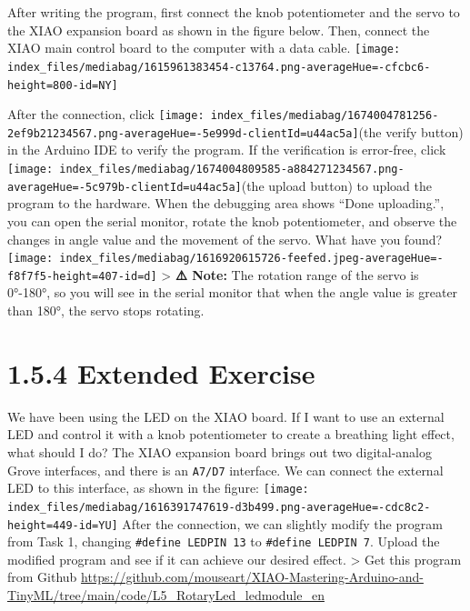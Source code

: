 \documentclass[
  letterpaper,
  DIV=11,
  numbers=noendperiod]{scrreprt}
\begin{document}
After writing the program, first connect the knob potentiometer and the
servo to the XIAO expansion board as shown in the figure below. Then,
connect the XIAO main control board to the computer with a data cable.
\texttt{[image: index\_files/mediabag/1615961383454-c13764.png-averageHue=-cfcbc6-height=800-id=NY]}

After the connection, click
\texttt{[image: index\_files/mediabag/1674004781256-2ef9b21234567.png-averageHue=-5e999d-clientId=u44ac5a]}(the
verify button) in the Arduino IDE to verify the program. If the
verification is error-free, click
\texttt{[image: index\_files/mediabag/1674004809585-a884271234567.png-averageHue=-5c979b-clientId=u44ac5a]}(the
upload button) to upload the program to the hardware. When the debugging
area shows ``Done uploading.'', you can open the serial monitor, rotate
the knob potentiometer, and observe the changes in angle value and the
movement of the servo. What have you found?
\texttt{[image: index\_files/mediabag/1616920615726-feefed.jpeg-averageHue=-f8f7f5-height=407-id=d]}
\textgreater{} \textbf{⚠️ Note:} The rotation range of the servo is
0°-180°, so you will see in the serial monitor that when the angle value
is greater than 180°, the servo stops rotating.

\hypertarget{extended-exercise-2}{%
\section*{1.5.4 Extended Exercise}\label{extended-exercise-2}}


We have been using the LED on the XIAO board. If I want to use an
external LED and control it with a knob potentiometer to create a
breathing light effect, what should I do? The XIAO expansion board
brings out two digital-analog Grove interfaces, and there is an
\texttt{A7/D7} interface. We can connect the external LED to this
interface, as shown in the figure:
\texttt{[image: index\_files/mediabag/1616391747619-d3b499.png-averageHue=-cdc8c2-height=449-id=YU]}
After the connection, we can slightly modify the program from Task 1,
changing \texttt{\#define\ LEDPIN\ 13} to \texttt{\#define\ LEDPIN\ 7}.
Upload the modified program and see if it can achieve our desired
effect. \textgreater{} Get this program from Github
\url{https://github.com/mouseart/XIAO-Mastering-Arduino-and-TinyML/tree/main/code/L5_RotaryLed_ledmodule_en}
\end{document}
